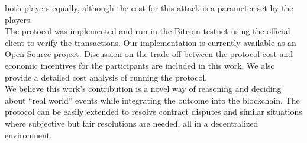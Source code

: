   both players equally, although the cost for this attack is a parameter set by
  the players.\\
\noindent
The protocol was implemented and run in the Bitcoin testnet using the official
  client to verify the transactions.
Our implementation is currently available as an Open Source project.
Discussion on the trade off between the protocol cost and economic incentives
  for the participants are included in this work.
We also provide a detailed cost analysis of running the protocol.\\
\noindent
We believe this work's contribution is a novel way of reasoning and deciding
  about ``real world'' events while integrating the outcome into the blockchain.
The protocol can be easily extended to resolve contract disputes and similar
  situations where subjective but fair resolutions are needed, all in a
  decentralized environment.
